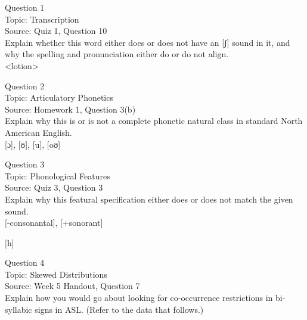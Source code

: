 \documentclass[12pt]{article}
\begin{document}
{\large Question 1}\\

Topic: Transcription\\
Source: Quiz 1, Question 10\\

Explain whether this word either does or does not have an [ʃ] sound in it, and why the spelling and pronunciation either do or do not align.\\

<lotion>


\newpage

{\large Question 2}\\

Topic: Articulatory Phonetics\\
Source: Homework 1, Question 3(b)\\

Explain why this is or is not a complete phonetic natural class in standard North American English.\\

{[ɔ]}, {[ʊ]}, {[u]}, {[oʊ]}


\newpage

{\large Question 3}\\

Topic: Phonological Features\\
Source: Quiz 3, Question 3\\

Explain why this featural specification either does or does not match the given sound.\\

{[-consonantal]}, {[+sonorant]}

{[h]}


\newpage

{\large Question 4}\\

Topic: Skewed Distributions\\
Source: Week 5 Handout, Question 7\\

Explain how you would go about looking for co-occurrence restrictions in bi-syllabic signs in ASL. (Refer to the data that follows.)\\
\end{document}

